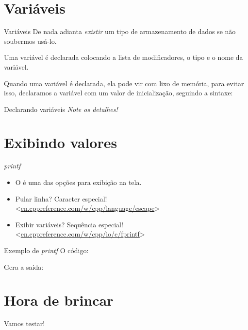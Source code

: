 \documentclass[11pt]{beamer}
\begin{document}
\section{Variáveis}
	\begin{frame}{Variáveis}
		De nada adianta \emph{existir} um tipo de armazenamento de dados se não soubermos usá-lo.

		\presentationPause Uma variável é declarada colocando a lista de modificadores, o tipo e o nome da variável.

		\presentationPause

		\presentationPause Quando uma variável é declarada, ela pode vir com lixo de memória, para evitar isso, declaramos a variável com um valor de inicialização, seguindo a sintaxe:

		\presentationPause
	\end{frame}

	\begin{frame}{Declarando variáveis}
		\presentationPause
			\presentationPause\emph{Note os detalhes!}
	\end{frame}

\section{Exibindo valores}
	\begin{frame}{\textit{printf}}
		\begin{itemize}
			\presentationPause\item O  é uma das opções para exibição na tela.
			\presentationPause\item Pular linha? Caracter especial! <\href{http://en.cppreference.com/w/cpp/language/escape}{en.cppreference.com/w/cpp/language/escape}>
			\presentationPause\item Exibir variáveis? Sequência especial! <\href{http://en.cppreference.com/w/cpp/io/c/fprintf}{en.cppreference.com/w/cpp/io/c/fprintf}>
		\end{itemize}
		\presentationPause
	\end{frame}

	\begin{frame}{Exemplo de \textit{printf}}
		\presentationPause
		O código:
		

		\presentationPause
		Gera a saída:
		
	\end{frame}

\section{Hora de brincar}
	\begin{frame}
		\begin{center}\Huge
			Vamos testar!
		\end{center}
	\end{frame}
\end{document}
